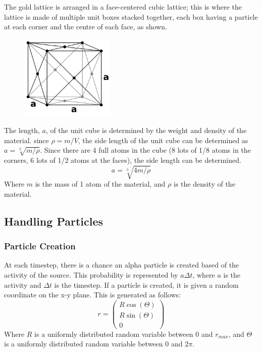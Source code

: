 \documentclass[11pt]{article}
\begin{document}
The gold lattice is arranged in a face-centered cubic lattice; this is
where the lattice is made of multiple unit boxes stacked together, each
box having a particle at each corner and the centre of each face, as
shown.

\quad
\begin{figure}[!ht]
	\centering
	\includegraphics[width=0.4\textwidth]{../images/FaceCentredCubic.png}
\end{figure}

The length, \(a\), of the unit cube is determined by the weight and
density of the material. since \(\rho = m/V\), the side length of the
unit cube can be determined as \(a = \sqrt[3]{m/\rho}\). Since there are
4 full atoms in the cube (8 lots of 1/8 atoms in the corners, 6 lots of
1/2 atoms at the faces), the side length can be determined.
\[ a = \sqrt[3]{4m/\rho} \] Where \(m\) is the mass of 1 atom of the
material, and \(\rho\) is the density of the material.

    \hypertarget{handling-particles}{%
\subsection{Handling Particles}\label{handling-particles}}

\hypertarget{particle-creation}{%
\subsubsection{Particle Creation}\label{particle-creation}}

At each timestep, there is a chance an alpha particle is created based
of the activity of the source. This probability is represented by
\(a \Delta t\), where \(a\) is the activity and \(\Delta t\) is the
timestep. If a particle is created, it is given a random coordinate on
the x-y plane. This is generated as follows:
\[ r = \begin{pmatrix} R \cos(\Theta) \\  R \sin(\Theta)  \\  0 \end{pmatrix} \]
Where \(R\) is a uniformly distributed random variable between 0 and
\(r_{max}\), and \(\Theta\) is a uniformly distributed random variable
between 0 and \(2\pi\).
\end{document}
